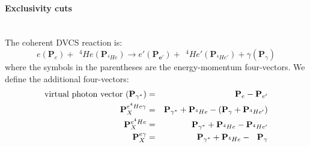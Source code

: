 \newpage
\paragraph{Exclusivity cuts}

~\\
The coherent DVCS reaction is:
\begin{equation}
e(\mathbf{P}_{e}) + ~~^{4}He(\mathbf{P}_{^{4}He}) \rightarrow 
e'(\mathbf{P_{e'}}) +  ~~^{4}He'(\mathbf{P}_{^{4}He'}) + 
\gamma(\mathbf{P}_{\gamma})
\label{coh_dvcs_equ}
\end{equation}
where the symbols in the parentheses are the energy-momentum four-vectors. We define the additional four-vectors:
\begin{eqnarray}
\text{virtual photon vector } (\mathbf{P}_{\gamma^{*}}) &=&  \mathbf{P}_{e} -  \mathbf{P}_{e'} \\
\hspace{0.4in}  \mathbf{P}^{e^{4}He\gamma}_{X} &=& \mathbf{P}_{\gamma^{*}} + \mathbf{P}_{^{4}He} - (\mathbf{P}_{\gamma} + \mathbf{P}_{^{4}He'})\\
~~~~~~~~~~\mathbf{P}^{e^{4}He}_{X} &=& \mathbf{P}_{\gamma^{*}} + \mathbf{P}_{^{4}He} -  \mathbf{P}_{^{4}He'} \\
\hspace{0.2in} \mathbf{P}^{e\gamma}_{X} &=& \mathbf{P}_{\gamma^{*}} + \mathbf{P}_{^{4}He} - ~~\mathbf{P}_{\gamma}
\end{eqnarray}

